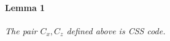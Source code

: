 \documentclass{article}
\begin{document}
\begin{multicols*}{2}
%
      


\paragraph{Lemma 1} \textit{ The pair $C_{x},C_{z}$ defined above is CSS code. } 


\end{multicols*}
\end{document}

